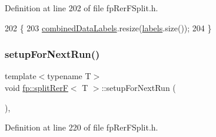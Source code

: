 Definition at line 202 of file fp\+Rer\+F\+Split.\+h.


\begin{DoxyCode}
202                                                 \{
203                     \hyperlink{classfp_1_1splitRerF_a2ce4d0a7ae4ba4958ddcc1adba71b2c9}{combinedDataLabels}.resize(\hyperlink{classfp_1_1splitRerF_a85d708ae07bbfae5205111082e4037df}{labels}.size());
204                 \}
\end{DoxyCode}
\mbox{\label{classfp_1_1splitRerF_ac7ee17995ee82e98a092089b5803fd70}} 
\subsubsection{\texorpdfstring{setup\+For\+Next\+Run()}{setupForNextRun()}}
{\footnotesize\ttfamily template$<$typename T$>$ \\
void \hyperlink{classfp_1_1splitRerF}{fp\+::split\+RerF}$<$ T $>$\+::setup\+For\+Next\+Run (\begin{DoxyParamCaption}{ }\end{DoxyParamCaption})\hspace{0.3cm}{\ttfamily [inline]}, {\ttfamily [protected]}}



Definition at line 220 of file fp\+Rer\+F\+Split.\+h.


